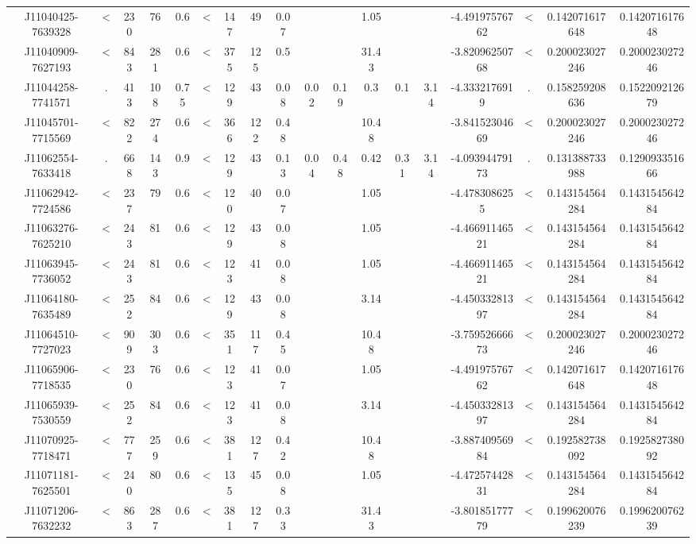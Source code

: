 \begin{table}
\begin{tabular}{cccccccccccccccccc}
J11040425-7639328 & < & 230 & 76 & 0.6 & < & 147 & 49 & 0.07 &  &  & 1.05 &  &  & -4.49197576762 & < & 0.142071617648 & 0.142071617648 \\
J11040909-7627193 & < & 843 & 281 & 0.6 & < & 375 & 125 & 0.5 &  &  & 31.43 &  &  & -3.82096250768 & < & 0.200023027246 & 0.200023027246 \\
J11044258-7741571 & . & 413 & 108 & 0.75 & < & 129 & 43 & 0.08 & 0.02 & 0.19 & 0.3 & 0.1 & 3.14 & -4.3332176919 & . & 0.158259208636 & 0.152209212679 \\
J11045701-7715569 & < & 822 & 274 & 0.6 & < & 366 & 122 & 0.48 &  &  & 10.48 &  &  & -3.84152304669 & < & 0.200023027246 & 0.200023027246 \\
J11062554-7633418 & . & 668 & 143 & 0.9 & < & 129 & 43 & 0.13 & 0.04 & 0.48 & 0.42 & 0.31 & 3.14 & -4.09394479173 & . & 0.131388733988 & 0.129093351666 \\
J11062942-7724586 & < & 237 & 79 & 0.6 & < & 120 & 40 & 0.07 &  &  & 1.05 &  &  & -4.4783086255 & < & 0.143154564284 & 0.143154564284 \\
J11063276-7625210 & < & 243 & 81 & 0.6 & < & 129 & 43 & 0.08 &  &  & 1.05 &  &  & -4.46691146521 & < & 0.143154564284 & 0.143154564284 \\
J11063945-7736052 & < & 243 & 81 & 0.6 & < & 123 & 41 & 0.08 &  &  & 1.05 &  &  & -4.46691146521 & < & 0.143154564284 & 0.143154564284 \\
J11064180-7635489 & < & 252 & 84 & 0.6 & < & 129 & 43 & 0.08 &  &  & 3.14 &  &  & -4.45033281397 & < & 0.143154564284 & 0.143154564284 \\
J11064510-7727023 & < & 909 & 303 & 0.6 & < & 351 & 117 & 0.45 &  &  & 10.48 &  &  & -3.75952666673 & < & 0.200023027246 & 0.200023027246 \\
J11065906-7718535 & < & 230 & 76 & 0.6 & < & 123 & 41 & 0.07 &  &  & 1.05 &  &  & -4.49197576762 & < & 0.142071617648 & 0.142071617648 \\
J11065939-7530559 & < & 252 & 84 & 0.6 & < & 123 & 41 & 0.08 &  &  & 3.14 &  &  & -4.45033281397 & < & 0.143154564284 & 0.143154564284 \\
J11070925-7718471 & < & 777 & 259 & 0.6 & < & 381 & 127 & 0.42 &  &  & 10.48 &  &  & -3.88740956984 & < & 0.192582738092 & 0.192582738092 \\
J11071181-7625501 & < & 240 & 80 & 0.6 & < & 135 & 45 & 0.08 &  &  & 1.05 &  &  & -4.47257442831 & < & 0.143154564284 & 0.143154564284 \\
J11071206-7632232 & < & 863 & 287 & 0.6 & < & 381 & 127 & 0.33 &  &  & 31.43 &  &  & -3.80185177779 & < & 0.199620076239 & 0.199620076239 \\

\end{tabular}
\end{table}
